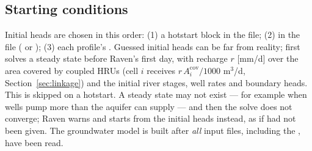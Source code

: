\subsection{Starting conditions}\label{sec:init}
Initial heads are chosen in this order: (1) a hotstart block  in the  file; (2)
 in the  file ( or ); (3) each profile's
. Guessed initial heads can be far from reality; 
first solves a steady state before Raven's first day, with recharge $r$ [mm/d] over the area covered by coupled HRUs
(cell $i$ receives $r\,A^{\mathrm{cov}}_i/1000$ m$^3$/d, Section~\ref{sec:linkage}) and the initial river stages, well rates and boundary heads. This is skipped on a hotstart. A steady state may not
exist --- for example when wells pump more than the aquifer can supply --- and then the solve does not converge; Raven
warns and starts from the initial heads instead, as if  had not been given. The groundwater model is built after \emph{all} input files,
including the , have been read.

